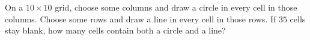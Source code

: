 On a $10\times10$ grid, choose some columns and draw a circle in every cell in those columns. Choose some rows and draw a line in every cell in those rows. If $35$ cells stay blank, how many cells contain both a circle and a line?
